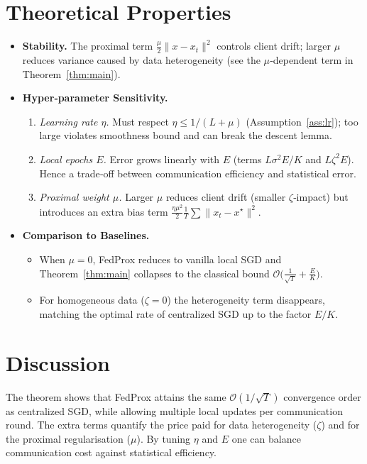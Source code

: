 \documentclass[11pt]{article}
\begin{document}
\section*{Theoretical Properties}
\begin{itemize}
    \item \textbf{Stability.} The proximal term $\frac{\mu}{2}\|x-x_t\|^2$ controls client drift; larger $\mu$ reduces variance caused by data heterogeneity (see the $\mu$‑dependent term in Theorem~\ref{thm:main}).
    \item \textbf{Hyper‑parameter Sensitivity.}
    \begin{enumerate}[label=(\alph*)]
        \item \emph{Learning rate $\eta$.} Must respect $\eta\le 1/(L+\mu)$ (Assumption~\ref{ass:lr}); too large violates smoothness bound and can break the descent lemma.
        \item \emph{Local epochs $E$.} Error grows linearly with $E$ (terms $L\sigma^2E/K$ and $L\zeta^2E$). Hence a trade‑off between communication efficiency and statistical error.
        \item \emph{Proximal weight $\mu$.} Larger $\mu$ reduces client drift (smaller $\zeta$‑impact) but introduces an extra bias term $\tfrac{\eta\mu^2}{2}\frac1T\sum\|x_t-x^\star\|^2$.
    \end{enumerate}
    \item \textbf{Comparison to Baselines.}
    \begin{itemize}
        \item When $\mu=0$, FedProx reduces to vanilla local SGD and Theorem~\ref{thm:main} collapses to the classical bound \(\mathcal{O}\bigl(\frac1{\sqrt{T}}+\frac{E}{K}\bigr)\).
        \item For homogeneous data ($\zeta=0$) the heterogeneity term disappears, matching the optimal rate of centralized SGD up to the factor $E/K$.
    \end{itemize}
\end{itemize}

\section*{Discussion}
The theorem shows that FedProx attains the same $\mathcal{O}(1/\sqrt{T})$ convergence order as centralized SGD, while allowing multiple local updates per communication round. The extra terms quantify the price paid for data heterogeneity ($\zeta$) and for the proximal regularisation ($\mu$). By tuning $\eta$ and $E$ one can balance communication cost against statistical efficiency.
\end{document}
